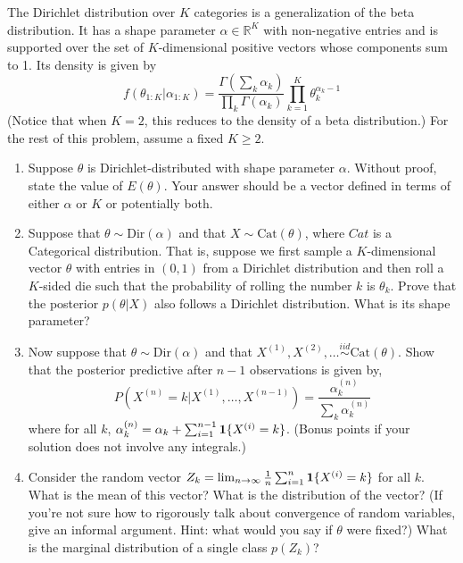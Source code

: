 \documentclass[submit]{harvardml}
\newcommand{\R}{\mathbb{R}}
\begin{document}
\begin{problem}
The Dirichlet distribution over $K$ categories is a generalization of the beta distribution. It has a shape parameter $\alpha \in \R^K$ with non-negative entries and is supported over the set of $K$-dimensional positive vectors whose components sum to 1. Its density is given by
\[ \displaystyle   f(\theta_{1:K} | \alpha_{1:K}) = \frac{\Gamma\left( \sum_{k} \alpha_k \right)}{\displaystyle \prod_{k} \Gamma(\alpha_k)} \prod_{k=1}^K \theta_k^{\alpha_k - 1} \]
(Notice that when $K=2$, this reduces to the density of a beta distribution.) For the rest of this problem, assume a fixed $K \geq 2$.
\begin{enumerate}[label=(\alph*)]
\item Suppose $\theta$ is Dirichlet-distributed with shape parameter $\alpha$. Without proof, state the value of $E(\theta)$. Your answer should be a vector defined in terms of either $\alpha$ or $K$ or potentially both.
\item Suppose that $\theta \sim \text{Dir}(\alpha)$ and that $X \sim \text{Cat}(\theta)$, where $Cat$ is a Categorical distribution. That is, suppose we first sample a $K$-dimensional vector $\theta$ with entries in $(0,1)$ from a Dirichlet distribution and then roll a $K$-sided die such that the probability of rolling the number $k$ is $\theta_k$. Prove that the posterior $p(\theta | X)$ also follows a Dirichlet distribution. What is its shape parameter?
\item Now suppose that $\theta \sim \text{Dir}(\alpha)$ and that $X^{(1)}, X^{(2)}, \ldots \stackrel{iid}{\sim} \text{Cat}(\theta)$. Show that the posterior predictive after $n-1$ observations is given by,
\[
P(X^{(n)} = k | X^{(1)}, \ldots, X^{(n-1)}) = \frac{\alpha^{(n)}_{k}}{\sum_{k} \alpha^{(n)}_{k}}
\]
where for all $k$, $\alpha_{k}^{(n)} = \alpha_k + \sum_{i=1}^{n-1} \mathbf{1}\{X^{(i)} = k\}$. (Bonus points if your solution does not involve any integrals.)
\item Consider the random vector $Z_k = \lim_{n \rightarrow \infty} \frac{1}{n}\sum_{i=1}^n \mathbf{1}\{X^{(i)} = k\}$ for all $k$.
    What is the mean of this vector?  What is the distribution of the vector? (If you're not sure how to rigorously talk about convergence of random variables, give an informal argument. Hint: what would you say if $\theta$ were fixed?) What is the marginal distribution of a single class $p(Z_k)$?


\end{enumerate}
\end{problem}
\end{document}
